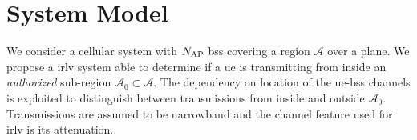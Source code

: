 \documentclass[conference,final]{IEEEtran}
\begin{document}

 
\section{System Model}\label{sec:sys model}


We consider a cellular system with $N_{\rm AP}$ \acp{bs} covering a region $\mathcal{A}$ over a plane. We propose a \ac{irlv} system able to determine if a \ac{ue} is transmitting from inside an {\em authorized} sub-region $\mathcal{A}_0 \subset \mathcal{A}$. The dependency on location of the \ac{ue}-\acp{bs} channels is exploited to distinguish between transmissions from inside and outside $\mathcal{A}_0$. Transmissions are assumed to be narrowband and the channel feature used for \ac{irlv} is its attenuation.
\end{document}

